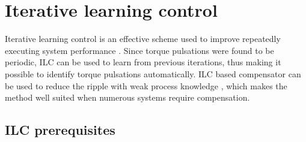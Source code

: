 \section{Iterative learning control}
Iterative learning control is an effective scheme used to improve repeatedly executing system performance \cite{ILC:2018}. Since torque pulsations were found to be periodic, ILC can be used to learn from previous iterations, thus making it possible to identify torque pulsations automatically. ILC based compensator can be used to reduce the ripple with weak process knowledge \cite{ILC:2007}, which makes the method well suited when numerous systems require compensation.






\subsection{ILC prerequisites}

